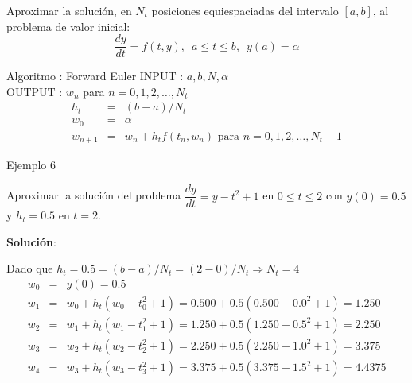 \documentclass{beamer}
\begin{document}
\begin{frame}{}

\begin{block}{}
Aproximar la solución, en $N_t$ posiciones equiespaciadas del intervalo $[a,b]$,  al problema de valor inicial:
\begin{displaymath}
\dfrac{d y}{d t} = f(t,y), \,\,\, a \leq t \leq b, \,\,\, y(a) = \alpha
\end{displaymath}
\end{block}

\begin{block}{Algoritmo : Forward Euler}
INPUT : $a,b,N, \alpha$ \\
OUTPUT : $w_n$ para $n = 0,1,2, \dots , N_t$
\begin{eqnarray*}
h_t & = &  (b-a)/N_t \\
w_0 & = & \alpha \\
w_{n+1} & = & w_n + h_t f(t_n, w_n) \text{ para } n = 0,1,2, \dots , N_t-1
\end{eqnarray*}

\end{block}

\end{frame}

\begin{frame}{Ejemplo 6}

\begin{block}{}
Aproximar la solución del problema	$\dfrac{dy}{dt} = y - t^2 + 1$ en $0 \leq t \leq 2$ con $y(0) = 0.5$ y $h_t = 0.5$ en $t = 2$.
\end{block}

\textbf{Solución}:

Dado que $h_t = 0.5 = (b-a)/N_t  = (2 -0) / N_t \Longrightarrow N_t = 4$
{\small
\begin{eqnarray*}
w_0 & = & y(0) = 0.5 \\
w_1 & = & w_{0} + h_t  (w_0 - t_0^2 + 1) = 0.500 + 0.5 (0.500 - 0.0^2 + 1) = 1.250 \\
w_2 & = & w_{1} + h_t  (w_1 - t_1^2 + 1) = 1.250 + 0.5 (1.250 - 0.5^2 + 1) = 2.250 \\
w_3 & = & w_{2} + h_t  (w_2 - t_2^2 + 1) = 2.250 + 0.5 (2.250 - 1.0^2 + 1) = 3.375 \\
\boxed{w_4} & = & w_{3} + h_t  (w_3 - t_3^2 + 1) = 3.375 + 0.5 (3.375 - 1.5^2 + 1) = \boxed{4.4375} 
\end{eqnarray*}
}
\end{frame}
\end{document}

